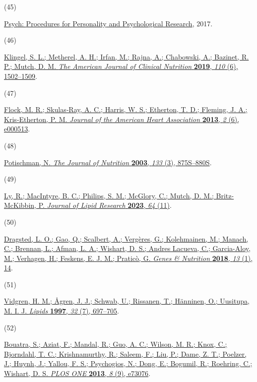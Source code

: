 \documentclass[journal=jacsat,manuscript=article]{achemso}
\newlength{\cslhangindent}
\newlength{\csllabelwidth}
\newenvironment{CSLReferences}[2] %
 {\begin{list}{}{%
  \setlength{\itemindent}{0pt}
  \setlength{\leftmargin}{0pt}
  \setlength{\parsep}{0pt}
  \ifodd #1
   \setlength{\leftmargin}{\cslhangindent}
   \setlength{\itemindent}{-1\cslhangindent}
  \fi
  \setlength{\itemsep}{#2\baselineskip}}}
 {\end{list}}
\newcommand{\CSLLeftMargin}[1]{\parbox[t]{\csllabelwidth}{#1}}
\newcommand{\CSLRightInline}[1]{\parbox[t]{\linewidth - \csllabelwidth}{#1}\break}
\begin{document}
\begin{CSLReferences}{0}{0}
\CSLLeftMargin{(45) }%
\CSLRightInline{\href{https://CRAN.R-project.org/package=psych}{Psych:
{Procedures} for {Personality} and {Psychological} {Research}}, 2017.}

\CSLLeftMargin{(46) }%
\CSLRightInline{\href{https://doi.org/10.1093/ajcn/nqz234}{Klingel, S.
L.; Metherel, A. H.; Irfan, M.; Rajna, A.; Chabowski, A.; Bazinet, R.
P.; Mutch, D. M. \emph{The American Journal of Clinical Nutrition}
\textbf{2019}, \emph{110} (6), 1502--1509}.}

\CSLLeftMargin{(47) }%
\CSLRightInline{\href{https://doi.org/10.1161/JAHA.113.000513}{Flock, M.
R.; Skulas‐Ray, A. C.; Harris, W. S.; Etherton, T. D.; Fleming, J. A.;
Kris‐Etherton, P. M. \emph{Journal of the American Heart Association}
\textbf{2013}, \emph{2} (6), e000513}.}

\CSLLeftMargin{(48) }%
\CSLRightInline{\href{https://doi.org/10.1093/jn/133.3.875S}{Potischman,
N. \emph{The Journal of Nutrition} \textbf{2003}, \emph{133} (3),
875S--880S}.}

\CSLLeftMargin{(49) }%
\CSLRightInline{\href{https://doi.org/10.1016/j.jlr.2023.100445}{Ly, R.;
MacIntyre, B. C.; Philips, S. M.; McGlory, C.; Mutch, D. M.;
Britz-McKibbin, P. \emph{Journal of Lipid Research} \textbf{2023},
\emph{64} (11)}.}

\CSLLeftMargin{(50) }%
\CSLRightInline{\href{https://doi.org/10.1186/s12263-018-0603-9}{Dragsted,
L. O.; Gao, Q.; Scalbert, A.; Vergères, G.; Kolehmainen, M.; Manach, C.;
Brennan, L.; Afman, L. A.; Wishart, D. S.; Andres Lacueva, C.;
Garcia-Aloy, M.; Verhagen, H.; Feskens, E. J. M.; Praticò, G.
\emph{Genes \& Nutrition} \textbf{2018}, \emph{13} (1), 14}.}

\CSLLeftMargin{(51) }%
\CSLRightInline{\href{https://doi.org/10.1007/s11745-997-0089-x}{Vidgren,
H. M.; Ågren, J. J.; Schwab, U.; Rissanen, T.; Hänninen, O.; Uusitupa,
M. I. J. \emph{Lipids} \textbf{1997}, \emph{32} (7), 697--705}.}

\CSLLeftMargin{(52) }%
\CSLRightInline{\href{https://doi.org/10.1371/journal.pone.0073076}{Bouatra,
S.; Aziat, F.; Mandal, R.; Guo, A. C.; Wilson, M. R.; Knox, C.;
Bjorndahl, T. C.; Krishnamurthy, R.; Saleem, F.; Liu, P.; Dame, Z. T.;
Poelzer, J.; Huynh, J.; Yallou, F. S.; Psychogios, N.; Dong, E.;
Bogumil, R.; Roehring, C.; Wishart, D. S. \emph{PLOS ONE} \textbf{2013},
\emph{8} (9), e73076}.}


\end{CSLReferences}
\end{document}
